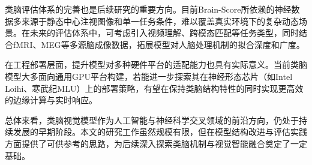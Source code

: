 类脑评估体系的完善也是后续研究的重要方向。目前Brain-Score所依赖的神经数据多来源于静态中心注视图像和单一任务条件，难以覆盖真实环境下的复杂动态场景。在未来的评估体系中，可考虑引入视频理解、跨模态匹配等任务类型，同时结合fMRI、MEG等多源脑成像数据，拓展模型对人脑处理机制的拟合深度和广度。

在工程部署层面，提升模型对多种硬件平台的适配能力也具有实际意义。当前类脑模型大多面向通用GPU平台构建，若能进一步探索其在神经形态芯片（如Intel Loihi、寒武纪MLU）上的部署策略，有望在保持类脑结构特性的同时实现更高效的边缘计算与实时响应。

总体来看，类脑视觉模型作为人工智能与神经科学交叉领域的前沿方向，仍处于持续发展的早期阶段。本文的研究工作虽然规模有限，但在模型结构改进与评估实践方面提供了可供参考的思路，为后续深入探索类脑机制与视觉智能融合奠定了一定基础。

